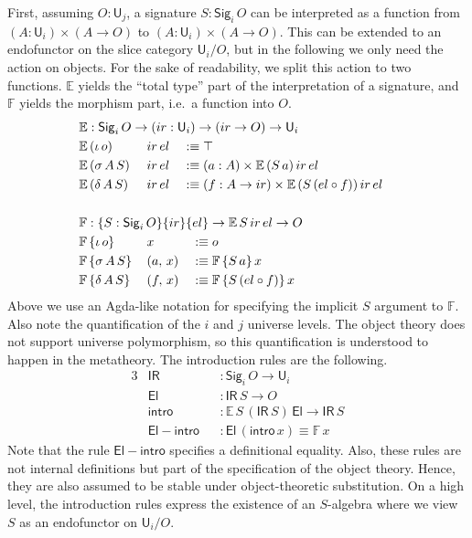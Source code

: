 \documentclass[acmsmall,screen,review]{acmart}
\newcommand{\msf}[1]{{\mathsf{#1}}}
\newcommand{\mbb}[1]{\mathbb{#1}}
\newcommand{\U}{\msf{U}}
\newcommand{\El}{\msf{El}}
\newcommand{\Sig}{\msf{Sig}}
\newcommand{\ir}{{ir}}
\newcommand{\el}{{el}}
\newcommand{\IR}{\msf{IR}}
\newcommand{\intro}{\msf{intro}}
\newcommand{\E}{\mbb{E}}
\newcommand{\F}{\mbb{F}}
\begin{document}
First, assuming $O : \U_j$, a signature $S : \Sig_i\,O$ can be interpreted as a function from $(A : \U_i) \times (A \to O)$ to
$(A : \U_i) \times (A \to O)$. This can be extended to an endofunctor on the slice category
$\U_i/O$, but in the following we only need the action on objects. For the sake of readability, we
split this action to two functions. $\E$ yields the ``total type'' part of the interpretation of a
signature, and $\F$ yields the morphism part, i.e.\ a function into $O$.
\begin{alignat*}{3}
  &\rlap{$\E : \Sig_i\,O \to (\ir : \U_i) \to (\ir \to O) \to \U_i$} \\
  &\E\,(\iota\,o)    \,&&\ir\,\el && \hspace{-0.7em}:\equiv \top\\
  &\E\,(\sigma\,A\,S)\,&&\ir\,\el && \hspace{-0.7em}:\equiv (a : A) \times \E\,(S\,a)\,\ir\,\el\\
  &\E\,(\delta\,A\,S)\,&&\ir\,\el && \hspace{-0.7em}:\equiv (f : A \to \ir) \times \E\,(S\,(\el \circ f))\,\ir\,\el\\
  & && &&\\
  &\rlap{$\F : \{S : \Sig_i\,O\}\{\ir\}\{\el\} \to \E\,S\,\ir\,\el \to O$} \\
  &\F\,\{\iota\,o\}    \,&&x       && :\equiv o\\
  &\F\,\{\sigma\,A\,S\}\,&&(a,\,x) && :\equiv \F\,\{S\,a\}\,x\\
  &\F\,\{\delta\,A\,S\}\,&&(f,\,x) && :\equiv \F\,\{S\,(\el \circ f)\}\,x
\end{alignat*}
Above we use an Agda-like notation for specifying the implicit $S$ argument to $\F$. Also note the
quantification of the $i$ and $j$ universe levels. The object theory does not support universe
polymorphism, so this quantification is understood to happen in the metatheory. The introduction
rules are the following.
\begin{alignat*}{3}
  &\IR                && : \Sig_i\,O \to \U_i\\
  &\El                && : \IR\,S \to O\\
  &\intro             && : \E\,S\,(\IR\,S)\,\El \to \IR\,S\\
  &\msf{El\!\!-\!\!intro} && : \El\,(\intro\,x) \equiv \F\,x
\end{alignat*}
Note that the rule $\msf{El\!\!-\!\!intro}$ specifies a definitional equality. Also, these rules are
not internal definitions but part of the specification of the object theory. Hence, they are also
assumed to be stable under object-theoretic substitution. On a high level, the introduction rules
express the existence of an $S$-algebra where we view $S$ as an endofunctor on $\U_i/O$.
\end{document}
